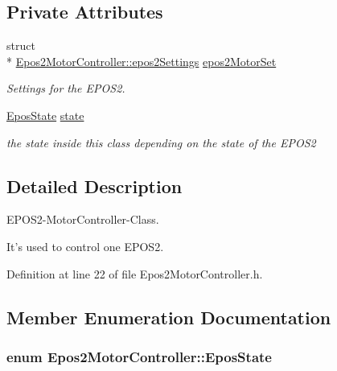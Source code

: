 \subsection*{Private Attributes}
\begin{DoxyCompactItemize}
\item 
\hypertarget{classEpos2MotorController_a0856f5fdd71ffa3b84a536afa085bfb1}{struct \\*
\hyperlink{structEpos2MotorController_1_1epos2Settings}{Epos2\-Motor\-Controller\-::epos2\-Settings} \hyperlink{classEpos2MotorController_a0856f5fdd71ffa3b84a536afa085bfb1}{epos2\-Motor\-Set}}\label{classEpos2MotorController_a0856f5fdd71ffa3b84a536afa085bfb1}

\begin{DoxyCompactList}\small\item\em Settings for the E\-P\-O\-S2. \end{DoxyCompactList}\item 
\hyperlink{classEpos2MotorController_ab5ec630dfbb90ad674e311187926060c}{Epos\-State} \hyperlink{classEpos2MotorController_a7194b8efd4f2fd5a4d64b10135c416e2}{state}
\begin{DoxyCompactList}\small\item\em the state inside this class depending on the state of the E\-P\-O\-S2 \end{DoxyCompactList}\end{DoxyCompactItemize}


\subsection{Detailed Description}
E\-P\-O\-S2-\/\-Motor\-Controller-\/\-Class. 

It's used to control one E\-P\-O\-S2. 

Definition at line 22 of file Epos2\-Motor\-Controller.\-h.



\subsection{Member Enumeration Documentation}
\hypertarget{classEpos2MotorController_ab5ec630dfbb90ad674e311187926060c}{
\subsubsection[{Epos\-State}]{\setlength{\rightskip}{0pt plus 5cm}enum {\bf Epos2\-Motor\-Controller\-::\-Epos\-State}}}\label{classEpos2MotorController_ab5ec630dfbb90ad674e311187926060c}


